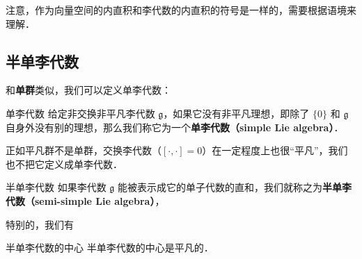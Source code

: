 注意，作为向量空间的内直积和李代数的内直积的符号是一样的，需要根据语境来理解．

\subsection{半单李代数}

和\textbf{单群}类似，我们可以定义单李代数：

\begin{definition}{单李代数}
给定非交换非平凡李代数 $\mathfrak{g}$，如果它没有非平凡理想，即除了 $\{0\}$ 和 $\mathfrak{g}$ 自身外没有别的理想，那么我们称它为一个\textbf{单李代数（simple Lie algebra）}．
\end{definition}

正如平凡群不是单群，交换李代数（$[\cdot, \cdot] = 0$）在一定程度上也很“平凡”，我们也不把它定义成单李代数．


\begin{definition}{半单李代数}\label{LieSub_def1}
如果李代数 $\mathfrak{g}$ 能被表示成它的单子代数的直和，我们就称之为\textbf{半单李代数（semi-simple Lie algebra）}，
\end{definition}

特别的，我们有
\begin{theorem}{半单李代数的中心}
半单李代数的中心是平凡的．
\end{theorem}


